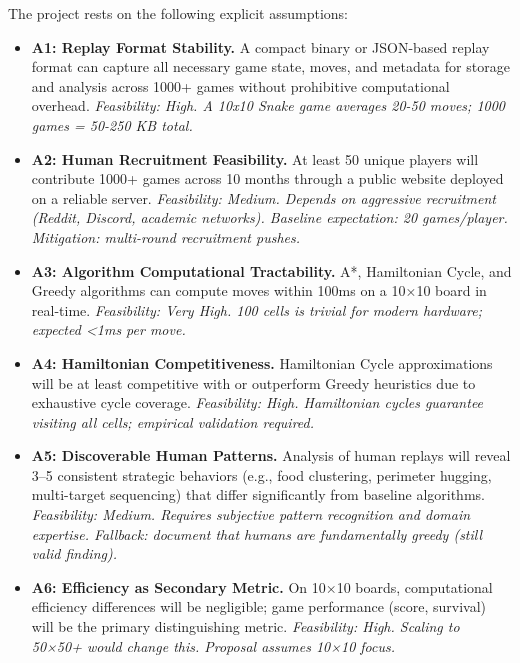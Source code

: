 \documentclass[a4paper]{article}
\begin{document}
The project rests on the following explicit assumptions:

\begin{itemize}
\item \textbf{A1: Replay Format Stability.} A compact binary or JSON-based replay format can capture all necessary game state, moves, and metadata for storage and analysis across 1000+ games without prohibitive computational overhead. \textit{Feasibility: High. A 10x10 Snake game averages 20-50 moves; 1000 games = 50-250 KB total.}

\item \textbf{A2: Human Recruitment Feasibility.} At least 50 unique players will contribute 1000+ games across 10 months through a public website deployed on a reliable server. \textit{Feasibility: Medium. Depends on aggressive recruitment (Reddit, Discord, academic networks). Baseline expectation: 20 games/player. Mitigation: multi-round recruitment pushes.}

\item \textbf{A3: Algorithm Computational Tractability.} A*, Hamiltonian Cycle, and Greedy algorithms can compute moves within 100ms on a 10×10 board in real-time. \textit{Feasibility: Very High. 100 cells is trivial for modern hardware; expected <1ms per move.}

\item \textbf{A4: Hamiltonian Competitiveness.} Hamiltonian Cycle approximations will be at least competitive with or outperform Greedy heuristics due to exhaustive cycle coverage. \textit{Feasibility: High. Hamiltonian cycles guarantee visiting all cells; empirical validation required.}

\item \textbf{A5: Discoverable Human Patterns.} Analysis of human replays will reveal 3--5 consistent strategic behaviors (e.g., food clustering, perimeter hugging, multi-target sequencing) that differ significantly from baseline algorithms. \textit{Feasibility: Medium. Requires subjective pattern recognition and domain expertise. Fallback: document that humans are fundamentally greedy (still valid finding).}

\item \textbf{A6: Efficiency as Secondary Metric.} On 10×10 boards, computational efficiency differences will be negligible; game performance (score, survival) will be the primary distinguishing metric. \textit{Feasibility: High. Scaling to 50×50+ would change this. Proposal assumes 10×10 focus.}
\end{itemize}
\end{document}
